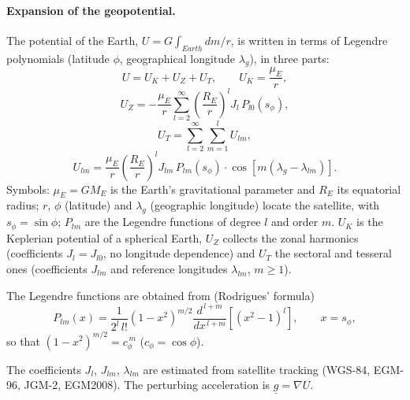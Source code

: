 \paragraph{Expansion of the geopotential.} The potential of the Earth, $U=G\int_{Earth}dm/r$, is written in terms of Legendre polynomials
(latitude $\phi$, geographical longitude $\lambda_g$), in three parts:
\begin{equation}
U=U_K+U_Z+U_T,\qquad U_K=\frac{\mu_E}{r},
\end{equation}
\begin{equation}
U_Z=-\frac{\mu_E}{r}\sum_{l=2}^{\infty}\left(\frac{R_E}{r}\right)^{l}J_l\,P_{l0}(s_\phi),
\end{equation}
\begin{equation}
U_T=\sum_{l=2}^{\infty}\sum_{m=1}^{l}U_{lm},
\end{equation}
\begin{equation}
U_{lm}=\frac{\mu_E}{r}\left(\frac{R_E}{r}\right)^{l}J_{lm}\,P_{lm}(s_\phi)\cdot\cos\!\left[m(\lambda_g-\lambda_{lm})\right].
\end{equation}
Symbols: $\mu_E=GM_E$ is the Earth's gravitational parameter and $R_E$ its equatorial radius; $r$, $\phi$ (latitude) and $\lambda_g$
(geographic longitude) locate the satellite, with $s_\phi=\sin\phi$; $P_{lm}$ are the Legendre functions of degree $l$ and order $m$.
$U_K$ is the Keplerian potential of a spherical Earth, $U_Z$ collects the zonal harmonics (coefficients $J_l=J_{l0}$, no longitude
dependence) and $U_T$ the sectoral and tesseral ones (coefficients $J_{lm}$ and reference longitudes $\lambda_{lm}$, $m\ge1$).

The Legendre functions are obtained from (Rodrigues' formula)
\begin{equation}
P_{lm}(x)=\frac{1}{2^{l}\,l!}\left(1-x^{2}\right)^{m/2}\frac{d^{\,l+m}}{dx^{\,l+m}}\left[(x^{2}-1)^{l}\right],\qquad x=s_\phi ,
\end{equation}
so that $(1-x^2)^{m/2}=c_\phi^{\,m}$ ($c_\phi=\cos\phi$).

The coefficients $J_l$, $J_{lm}$, $\lambda_{lm}$ are estimated from satellite tracking (WGS-84, EGM-96, JGM-2, EGM2008). The perturbing
acceleration is $\underline g=\nabla U$.


